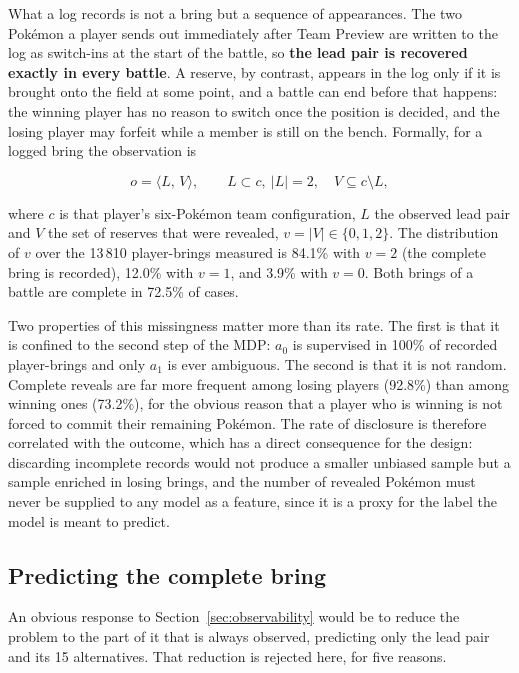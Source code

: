 \documentclass[conference]{IEEEtran}
\begin{document}
What a log records is not a bring but a sequence of appearances. The two
Pok\'emon a player sends out immediately after Team Preview are written to the
log as switch-ins at the start of the battle, so \textbf{the lead pair is
recovered exactly in every battle}. A reserve, by contrast, appears in the log
only if it is brought onto the field at some point, and a battle can end before
that happens: the winning player has no reason to switch once the position is
decided, and the losing player may forfeit while a member is still on the
bench. Formally, for a logged bring the observation is

\begin{equation}
o = \langle L,\, V \rangle, \qquad L \subset c,\ |L| = 2, \quad V \subseteq c \setminus L ,
\label{eq:obs}
\end{equation}

\noindent where $c$ is that player's six-Pok\'emon team configuration, $L$ the
observed lead pair and $V$ the set of reserves that were revealed,
$v = |V| \in \{0,1,2\}$. The distribution of $v$ over the
13\,810 player-brings measured is 84.1\% with $v=2$ (the complete bring is
recorded), 12.0\% with $v=1$, and 3.9\% with $v=0$. Both brings of a battle are
complete in 72.5\% of cases.

Two properties of this missingness matter more than its rate. The first is that
it is confined to the second step of the MDP: $a_0$ is supervised in 100\% of
recorded player-brings and only $a_1$ is ever ambiguous. The second is that it
is not random. Complete reveals are far more frequent among losing players
(92.8\%) than among winning ones (73.2\%), for the obvious reason that a player
who is winning is not forced to commit their remaining Pok\'emon. The rate of
disclosure is therefore correlated with the outcome, which has a direct
consequence for the design: discarding incomplete records would not
produce a smaller unbiased sample but a sample enriched in losing brings, and
the number of revealed Pok\'emon must never be supplied to any model as a
feature, since it is a proxy for the label the model is meant to predict.

\subsection{Predicting the complete bring}
\label{sec:whyfull}

An obvious response to Section~\ref{sec:observability} would be to reduce the
problem to the part of it that is always observed, predicting only the lead
pair and its 15 alternatives. That reduction is rejected here, for five
reasons.
\end{document}

